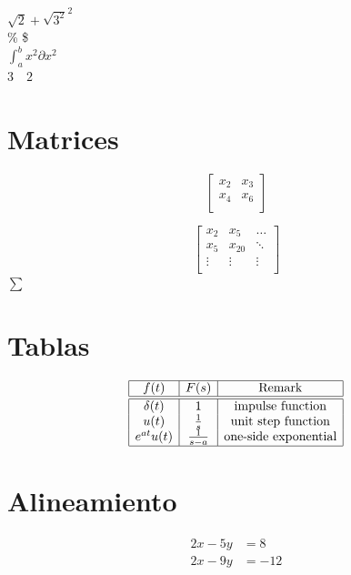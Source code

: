 \documentclass{article}
\begin{document}
$\sqrt{2} + \sqrt{3^2}^2$\\

\%  \$	\\
$\int_{a}^{b} x^2 \partial 
x^2$\\

$3\quad 2$ 

\section*{Matrices}

\[  
\begin{bmatrix}
	x_{2} & x_{3}\\
	x_{4} & x_{6}\\
\end{bmatrix}
	\]

\[	
	\begin{bmatrix}
	x_{2} & x_{5} & \dots\\
	x_{5} & x_{20} & \ddots\\
	\vdots & \vdots& \vdots\\
	\end{bmatrix}
	\]	
$\sum$

\section*{Tablas}

\[
\begin{array}{|c|c|c|}
\hline
f(t) & F(s) & \mbox{Remark}\\
\hline \hline
\delta(t) & 1 & \mbox{impulse function}\\
u(t) & \frac{1}{s} & \mbox{unit step function}\\
e^{at}u(t) & \frac{1}{s-a} & \mbox{one-side exponential}\\
\hline
\end{array}\]

\section*{Alineamiento}

\begin{align*}
2x - 5y &= 8\\
2x - 9y &= -12   
\end{align*}
\end{document}
